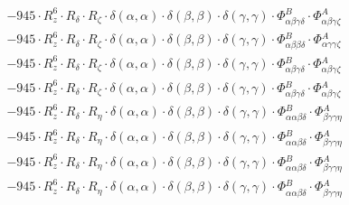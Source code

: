 \documentclass{article}
\begin{document}
\begin{subequations}
\begin{gather}
\begin{array}{c}
 \\[0.2em] 		 - 945 \cdot R_{z}^{6} \cdot R_{\delta{}} \cdot R_{\zeta{}} \cdot \delta{}\left(\alpha{}, \alpha{}\right) \cdot \delta{}\left(\beta{}, \beta{}\right) \cdot \delta{}\left(\gamma{}, \gamma{}\right) \cdot \Phi{}^{B}_{\alpha{}\beta{}\gamma{}\delta{}} \cdot \Phi{}^{A}_{\alpha{}\beta{}\gamma{}\zeta{}} 
 \\[0.2em] 		 - 945 \cdot R_{z}^{6} \cdot R_{\delta{}} \cdot R_{\zeta{}} \cdot \delta{}\left(\alpha{}, \alpha{}\right) \cdot \delta{}\left(\beta{}, \beta{}\right) \cdot \delta{}\left(\gamma{}, \gamma{}\right) \cdot \Phi{}^{B}_{\alpha{}\beta{}\beta{}\delta{}} \cdot \Phi{}^{A}_{\alpha{}\gamma{}\gamma{}\zeta{}} 
 \\[0.2em] 		 - 945 \cdot R_{z}^{6} \cdot R_{\delta{}} \cdot R_{\zeta{}} \cdot \delta{}\left(\alpha{}, \alpha{}\right) \cdot \delta{}\left(\beta{}, \beta{}\right) \cdot \delta{}\left(\gamma{}, \gamma{}\right) \cdot \Phi{}^{B}_{\alpha{}\beta{}\gamma{}\delta{}} \cdot \Phi{}^{A}_{\alpha{}\beta{}\gamma{}\zeta{}} 
 \\[0.2em] 		 - 945 \cdot R_{z}^{6} \cdot R_{\delta{}} \cdot R_{\zeta{}} \cdot \delta{}\left(\alpha{}, \alpha{}\right) \cdot \delta{}\left(\beta{}, \beta{}\right) \cdot \delta{}\left(\gamma{}, \gamma{}\right) \cdot \Phi{}^{B}_{\alpha{}\beta{}\gamma{}\delta{}} \cdot \Phi{}^{A}_{\alpha{}\beta{}\gamma{}\zeta{}} 
 \\[0.2em] 		 - 945 \cdot R_{z}^{6} \cdot R_{\delta{}} \cdot R_{\eta{}} \cdot \delta{}\left(\alpha{}, \alpha{}\right) \cdot \delta{}\left(\beta{}, \beta{}\right) \cdot \delta{}\left(\gamma{}, \gamma{}\right) \cdot \Phi{}^{B}_{\alpha{}\alpha{}\beta{}\delta{}} \cdot \Phi{}^{A}_{\beta{}\gamma{}\gamma{}\eta{}} 
 \\[0.2em] 		 - 945 \cdot R_{z}^{6} \cdot R_{\delta{}} \cdot R_{\eta{}} \cdot \delta{}\left(\alpha{}, \alpha{}\right) \cdot \delta{}\left(\beta{}, \beta{}\right) \cdot \delta{}\left(\gamma{}, \gamma{}\right) \cdot \Phi{}^{B}_{\alpha{}\alpha{}\beta{}\delta{}} \cdot \Phi{}^{A}_{\beta{}\gamma{}\gamma{}\eta{}} 
 \\[0.2em] 		 - 945 \cdot R_{z}^{6} \cdot R_{\delta{}} \cdot R_{\eta{}} \cdot \delta{}\left(\alpha{}, \alpha{}\right) \cdot \delta{}\left(\beta{}, \beta{}\right) \cdot \delta{}\left(\gamma{}, \gamma{}\right) \cdot \Phi{}^{B}_{\alpha{}\alpha{}\beta{}\delta{}} \cdot \Phi{}^{A}_{\beta{}\gamma{}\gamma{}\eta{}} 
 \\[0.2em] 		 - 945 \cdot R_{z}^{6} \cdot R_{\delta{}} \cdot R_{\eta{}} \cdot \delta{}\left(\alpha{}, \alpha{}\right) \cdot \delta{}\left(\beta{}, \beta{}\right) \cdot \delta{}\left(\gamma{}, \gamma{}\right) \cdot \Phi{}^{B}_{\alpha{}\alpha{}\beta{}\delta{}} \cdot \Phi{}^{A}_{\beta{}\gamma{}\gamma{}\eta{}} 

\end{array}
\end{gather}
\end{subequations}
\end{document}
